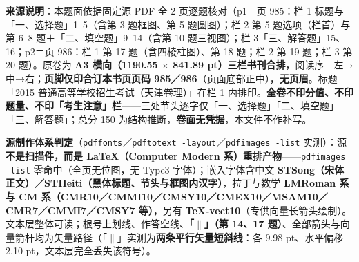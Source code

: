 


\begin{gktip}
\textbf{来源说明}：本题面依据固定源 PDF 全 2 页逐题核对（p1＝页 985：栏 1 标题与「一、选择题」1–5（含第 3 题框图、第 5 题圆图）；栏 2 第 5 题选项（栏首）与第 6–8 题＋「二、填空题」9–14（含第 10 题三视图）；栏 3「三、解答题」15、16；p2＝页 986：栏 1 第 17 题（含四棱柱图）、第 18 题；栏 2 第 19 题；栏 3 第 20 题）。原卷为 \textbf{A3 横向（1190.55 \(\times\) 841.89 pt）三栏书刊合排}，阅读序＝左→中→右；\textbf{页脚仅印合订本书页页码 985／986}（页面底部正中），\textbf{无页眉}。标题「2015 普通高等学校招生考试（天津卷理）」在栏 1 内排印。\textbf{全卷不印分值、不印题量、不印「考生注意」栏}——三处节头逐字仅「一、选择题」「二、填空题」「三、解答题」；总分 150 为结构推断，\textbf{卷面无凭据}，本文件不作补写。

\textbf{源制作体系判定}（\texttt{pdffonts}／\texttt{pdftotext -layout}／\texttt{pdfimages -list} 实测）：源\textbf{不是扫描件，而是 LaTeX（Computer Modern 系）重排产物}——\texttt{pdfimages -list} 零命中（全页无位图，无 Type3 字体）；嵌入字体含中文 \textbf{STSong（宋体正文）／STHeiti（黑体标题、节头与框图内汉字）}，拉丁与数学 \textbf{LMRoman 系与 CM 系（CMR10／CMMI10／CMSY10／CMEX10／MSAM10／CMR7／CMMI7／CMSY7 等）}，另有 \textbf{TeX-vect10}（专供向量长箭头绘制）。文本层整体可读；根号上划线、作答空线、\textbf{「$\parallel$」（第 14、17 题）}、全部箭头与向量箭杆均为矢量路径（「$\parallel$」实测为\textbf{两条平行矢量短斜线}：各 9.98 pt、水平偏移 2.10 pt，文本层完全丢失该符号）。


\end{gktip}
